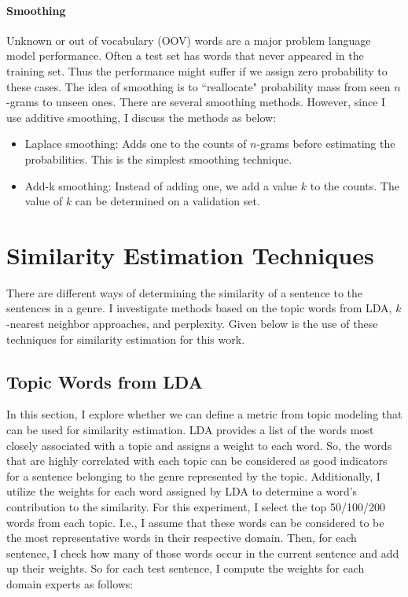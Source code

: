     
\paragraph*{Smoothing}

Unknown or out of vocabulary (OOV) words are a major problem language model performance. Often a test set has words that never appeared in the training set. Thus the performance might suffer if we assign zero probability to these cases. The idea of smoothing is to ``reallocate" probability mass from seen $n$-grams to unseen ones. There are several smoothing methods. However, since I use additive smoothing, I discuss the methods as below:

\begin{itemize}
    \item Laplace smoothing: Adds one to the counts of $n$-grams before estimating the probabilities. This is the simplest smoothing technique.
    \item Add-k smoothing: Instead of adding one, we add a value $k$ to the counts. The value of $k$ can be determined on a validation set. 
\end{itemize}



\section{Similarity Estimation Techniques}\label{sim}
   
There are different ways of determining the similarity of a sentence to the sentences in a genre. I investigate methods based on the topic words from LDA, $k$-nearest neighbor approaches, and  perplexity. Given below is the use of these techniques for similarity estimation for this work.

\subsection{Topic Words from LDA}

In this section, I explore whether we can define a metric from topic modeling that can be used for similarity estimation.
LDA provides a list of the words most closely associated with a topic and assigns a weight to each word.  So, the words that are highly correlated with each topic can be considered as good indicators for a sentence belonging to the genre represented by the topic. Additionally, I utilize the weights for each word assigned by LDA to determine a word's contribution to the similarity. For this experiment, I select the top 50/100/200 words from each topic. I.e., I assume that these words can be considered to be the most representative  words in their respective domain. Then, for each sentence, I check how many of those words occur in the current sentence and add up their weights. So for each test sentence, I compute the weights for each domain experts as follows: 

